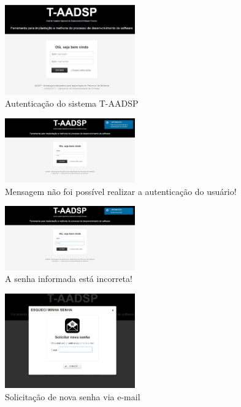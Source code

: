 \documentclass{acm_proc_article-sp}
\begin{document}
\begin{appendices}
\begin{table}[h]
\begin{tabular}{|p{10mm}|p{60mm}|p{60mm}|p{25mm}|}
\hline
\end{tabular}
\end{table}

\begin{figure}[h]
\centering %
\includegraphics[width=0.5\textwidth]{RF_autenticacao.jpg} %
\caption{Autenticação do sistema T-AADSP}
\end{figure}

\begin{figure}[h]
\centering %
\includegraphics[width=0.5\textwidth]{RF_autenticacao_dados_incorretos.jpg} %
\caption{Mensagem não foi possível realizar a autenticação do usuário! }
\end{figure}

\begin{figure}[h]
\centering %
\includegraphics[width=0.5\textwidth]{RF_autenticacao_senha_incorreta.jpg} %
\caption{A senha informada está incorreta! }
\end{figure}

\begin{figure}[h]
\centering %
\includegraphics[width=0.5\textwidth]{RF_autenticacao_solicitar_nova_senha.jpg} %
\caption{Solicitação de nova senha via e-mail }
\end{figure}


\end{appendices}
\end{document}
